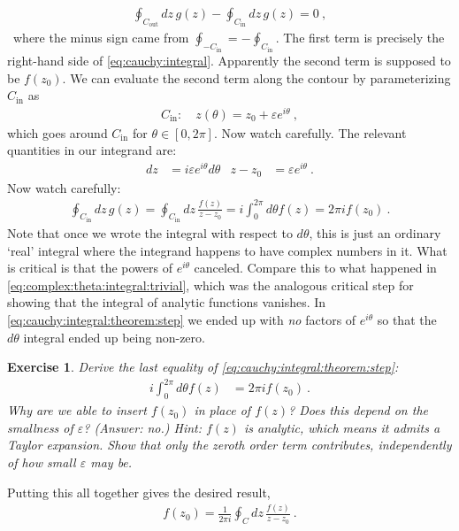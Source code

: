 \documentclass[
  11pt,
	colorful,
	raggedright,
]{tufte-style-thesis-flip}
\newtheorem{exercise}{Exercise}[section]
\begin{document}
\begin{align}
  \oint_{C_\text{out}} dz\, g(z)
  -
  \oint_{C_\text{in}} dz\, g(z)
  = 0 \ ,
\end{align}\
where the minus sign came from $\oint_{-C_\text{in}} = - \oint_{C_\text{in}}$. The first term is precisely the right-hand side of \eqref{eq:cauchy:integral}. Apparently the second term is supposed to be $f(z_0)$. We can evaluate the second term along the contour by parameterizing $C_\text{in}$ as
\begin{align}
  C_\text{in}: \quad z(\theta) = z_0 + \varepsilon e^{i\theta} \ ,
\end{align}
which goes around $C_\text{in}$ for $\theta \in [0,2\pi]$. Now watch carefully. The relevant quantities in our integrand are:
\begin{align}
  dz &= i\varepsilon e^{i\theta} d\theta 
  &
  z-z_0 &= \varepsilon e^{i\theta} \ .
\end{align}
Now watch carefully: 
\begin{align}
  \oint_{C_\text{in}} dz\, g(z)
  =
  \oint_{C_\text{in}} dz\, \frac{f(z)}{z-z_0}
  = 
  i\int_0^{2\pi} d\theta f(z) 
  = 2\pi i f(z_0) \ . 
  \label{eq:cauchy:integral:theorem:step}
\end{align}
Note that once we wrote the integral with respect to $d\theta$, this is just an ordinary `real' integral where the integrand happens to have complex numbers in it. What is critical is that the powers of $e^{i\theta}$ canceled. Compare this to what happened in \eqref{eq:complex:theta:integral:trivial}, which was the analogous critical step for showing that the integral of analytic functions vanishes. In \eqref{eq:cauchy:integral:theorem:step} we ended up with \emph{no} factors of $e^{i\theta}$ so that the $d\theta$ integral ended up being non-zero. 
\begin{exercise}
Derive the last equality of \eqref{eq:cauchy:integral:theorem:step}:
\begin{align}
  i\int_0^{2\pi} d\theta f(z) 
  &= 2\pi i f(z_0) \ .
\end{align}
Why are we able to insert $f(z_0)$ in place of $f(z)$? Does this depend on the smallness of $\varepsilon$? (Answer: no.) {Hint}: $f(z)$ is analytic, which means it admits a Taylor expansion. Show that only the zeroth order term contributes, independently of how small $\varepsilon$ may be.
\end{exercise}

Putting this all together gives the desired result,
\begin{align}
  f(z_0) = \frac{1}{2\pi i}\oint_C dz\, \frac{f(z)}{z-z_0} \ .
  \label{eq:cauchy:integral:theorem}
\end{align}
\end{document}
